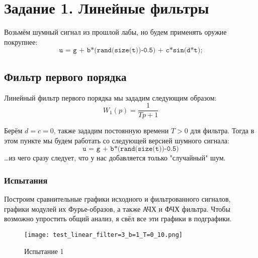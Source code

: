 \chapter{Задание 1. Линейные фильтры}
\label{ch:chap2}


\lstset{style=mystyle}

Возьмём шумный сигнал из прошлой лабы, но будем применять оружие покрупнее:
$$
\texttt{u = g + b*(rand(size(t))-0.5) + c*sin(d*t);}
$$

\section{Фильтр первого порядка}
Линейный фильтр первого порядка мы зададим следующим образом:
$$ W_1(p)=\frac{1}{Tp + 1}$$

Берём $d=c=0$, также зададим постоянную времени $T > 0$ для фильтра. Тогда в этом пункте мы будем работать со следующей версией шумного сигнала:
$$\texttt{u = g + b*(rand(size(t))-0.5)}$$
\dots из чего сразу следует, что у нас добавляется только "случайный" шум.

\subsection{Испытания}
Построим сравнительные графики исходного и фильтрованного сигналов, графики модулей их Фурье-образов, а также АЧХ  и ФЧХ фильтра. 
Чтобы возможно упростить общий анализ, я свёл все эти графики в подграфики.


\begin{figure}[ht]
    \centering
    \texttt{[image: test\_linear\_filter=3\_b=1\_T=0\_10.png]}
	\caption{Испытание 1}
\end{figure}

